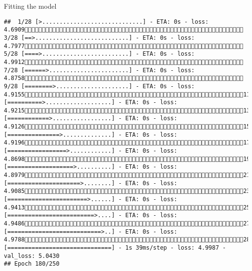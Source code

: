 \documentclass[
  ignorenonframetext,
]{beamer}
\begin{document}
\begin{frame}[fragile]{Fitting the model}
\begin{verbatim}
##  1/28 [>.............................] - ETA: 0s - loss: 4.6909 3/28 [==>...........................] - ETA: 0s - loss: 4.7977 5/28 [====>.........................] - ETA: 0s - loss: 4.9912 7/28 [======>.......................] - ETA: 0s - loss: 4.8758 9/28 [========>.....................] - ETA: 0s - loss: 4.915511/28 [==========>...................] - ETA: 0s - loss: 4.921513/28 [============>.................] - ETA: 0s - loss: 4.912615/28 [===============>..............] - ETA: 0s - loss: 4.919617/28 [=================>............] - ETA: 0s - loss: 4.869819/28 [===================>..........] - ETA: 0s - loss: 4.897921/28 [=====================>........] - ETA: 0s - loss: 4.908523/28 [=======================>......] - ETA: 0s - loss: 4.941325/28 [=========================>....] - ETA: 0s - loss: 4.948627/28 [===========================>..] - ETA: 0s - loss: 4.978828/28 [==============================] - 1s 39ms/step - loss: 4.9987 - val_loss: 5.0430
## Epoch 180/250

\end{verbatim}
\end{frame}
\end{document}
